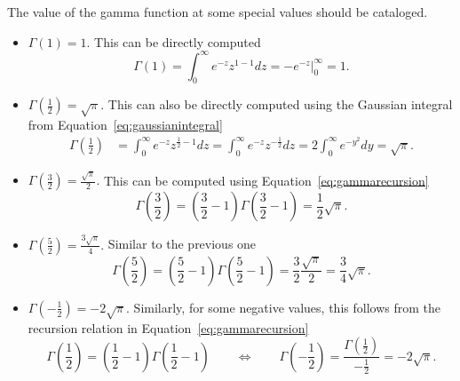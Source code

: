 The value of the gamma function at some special values should be cataloged.
\begin{itemize}
  \item $\boxed{ \Gamma(1) = 1. }$ This can be directly computed
    \begin{equation*}
      \Gamma(1) = \int_0^\infty e^{-z} z^{1 - 1} dz = \left. -e^{-z} \right|_0^\infty = 1.
    \end{equation*}
  \item $ \boxed{ \Gamma\left(\frac{1}{2}\right) = \sqrt{\pi}. }$ This can also be directly computed using the Gaussian integral from Equation~\ref{eq:gaussianintegral} 
    \begin{align*}
      \Gamma\left(\frac{1}{2}\right) &= \int_0^\infty e^{-z} z^{\frac{1}{2} - 1} dz 
      = \int_0^\infty e^{-z} z^{-\frac{1}{2}} dz 
      = 2 \int_0^\infty e^{-y^2} dy 
      = \sqrt{\pi}.
    \end{align*}
  \item $ \boxed{ \Gamma\left(\frac{3}{2}\right) = \frac{\sqrt{\pi}}{2}. }$  This can be computed using Equation~\ref{eq:gammarecursion}
    \begin{equation*}
      \Gamma \left( \frac{3}{2} \right) = \left( \frac{3}{2} -1 \right) \Gamma \left( \frac{3}{2} - 1 \right) = \frac{1}{2} \sqrt{\pi}.
    \end{equation*}
  \item $\boxed{ \Gamma\left(\frac{5}{2}\right) = \frac{3 \sqrt{\pi}}{4}. }$ Similar to the previous one
    \begin{equation*}
      \Gamma \left( \frac{5}{2} \right) = \left( \frac{5}{2} - 1 \right) \Gamma \left( \frac{5}{2} - 1 \right) = \frac{3}{2} \frac{\sqrt{\pi}}{2} = \frac{3}{4} \sqrt{\pi}.
    \end{equation*}
  \item $\boxed { \Gamma \left( -\frac{1}{2} \right) = -2 \sqrt{\pi}.  }$  Similarly, for some negative values, this follows from the recursion relation in Equation~\ref{eq:gammarecursion}
    \begin{equation*}
      \Gamma \left( \frac{1}{2} \right) = \left( \frac{1}{2} - 1 \right) \Gamma \left( \frac{1}{2} - 1 \right) \qquad \Longleftrightarrow \qquad \Gamma \left( -\frac{1}{2} \right) = \frac{\Gamma \left( \frac{1}{2} \right)}{-\frac{1}{2}} = -2 \sqrt{\pi}.
    \end{equation*}
\end{itemize}

